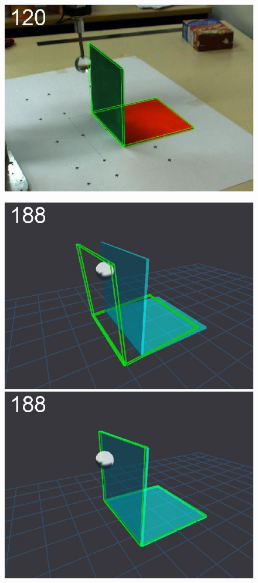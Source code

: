 \begin{figure}[tb]
{\includegraphics[width=\imgBXwid]{./B2_LWPR1_58_1}
}
\centerline{
\includegraphics[width=\imgBXwid]{./B1_1exp_20_2}
\includegraphics[width=\imgBXwid]{./B1_2exp_20_2}
}
\end{figure}
